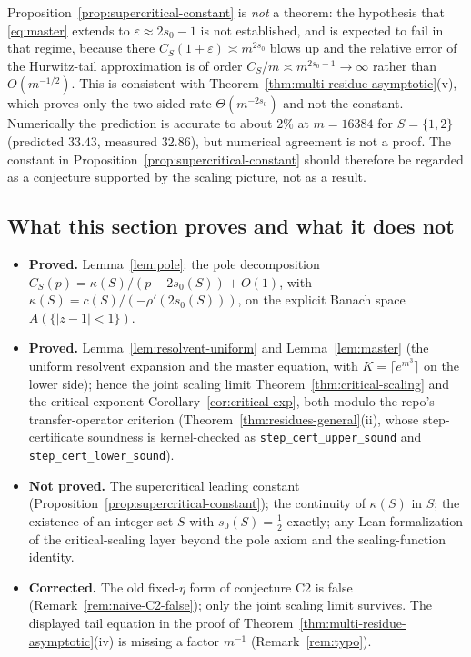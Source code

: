 \begin{remark}\label{rem:supercritical-status}
Proposition~\ref{prop:supercritical-constant} is \emph{not} a theorem: the
hypothesis that \eqref{eq:master} extends to
$\varepsilon\approx2s_0-1$ is not established, and is expected to fail in that
regime, because there $C_S(1+\varepsilon)\asymp m^{2s_0}$ blows up and the
relative error of the Hurwitz-tail approximation is of order
$C_S/m\asymp m^{2s_0-1}\to\infty$ rather than $O(m^{-1/2})$. This is consistent
with Theorem~\ref{thm:multi-residue-asymptotic}(v), which proves only the
two-sided rate $\Theta(m^{-2s_0})$ and not the constant. Numerically the
prediction is accurate to about $2\%$ at $m=16384$ for $S=\{1,2\}$
(predicted $33.43$, measured $32.86$), but numerical agreement is not a proof.
The constant in Proposition~\ref{prop:supercritical-constant} should therefore
be regarded as a conjecture supported by the scaling picture, not as a result.
\end{remark}

\subsection{What this section proves and what it does not}

\begin{itemize}[leftmargin=1.6em]
\item \textbf{Proved.} Lemma~\ref{lem:pole}: the pole decomposition
$C_S(p)=\kappa(S)/(p-2s_0(S))+O(1)$, with $\kappa(S)=c(S)/(-\rho'(2s_0(S)))$,
on the explicit Banach space $A(\{|z-1|<1\})$.
\item \textbf{Proved.} Lemma~\ref{lem:resolvent-uniform} and Lemma~\ref{lem:master}
(the uniform resolvent expansion and the master equation, with
$K=\lceil e^{m^3}\rceil$ on the lower side); hence the joint scaling limit
Theorem~\ref{thm:critical-scaling} and the critical exponent
Corollary~\ref{cor:critical-exp}, both modulo the repo's transfer-operator
criterion (Theorem~\ref{thm:residues-general}(ii), whose step-certificate
soundness is kernel-checked as \texttt{step\_cert\_upper\_sound} and
\texttt{step\_cert\_lower\_sound}).
\item \textbf{Not proved.} The supercritical leading constant
(Proposition~\ref{prop:supercritical-constant}); the continuity of $\kappa(S)$ in
$S$; the existence of an integer set $S$ with $s_0(S)=\frac12$ exactly; any
Lean formalization of the critical-scaling layer beyond the pole axiom and the
scaling-function identity.
\item \textbf{Corrected.} The old fixed-$\eta$ form of conjecture C2 is false
(Remark~\ref{rem:naive-C2-false}); only the joint scaling limit survives. The
displayed tail equation in the proof of
Theorem~\ref{thm:multi-residue-asymptotic}(iv) is missing a factor $m^{-1}$
(Remark~\ref{rem:typo}).
\end{itemize}
